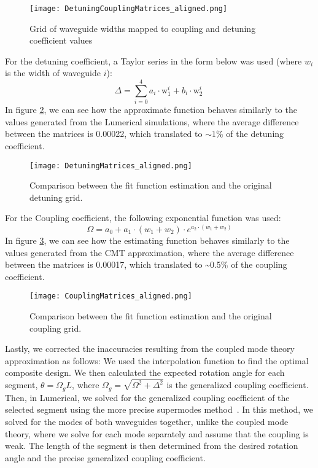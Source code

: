 \documentclass[floatfix,reprint, amsmath,amssymb,aps,superscriptaddress,nofootinbib]{revtex4-2}
\begin{document}
\begin{figure}[!h]
    \centering
    \texttt{[image: DetuningCouplingMatrices\_aligned.png]}
    \caption{Grid of waveguide widths mapped to coupling and detuning coefficient values}
    \label{fig: coupling and detuning coefficient mapping}
\end{figure}

For the detuning coefficient, a Taylor series in the form below was used (where $w_{i}$ is the width of waveguide $i$):
$$ \Delta = \sum_{i = 0}^{4} a_{i} \cdot  \text{w}_{1}^{i} + b_{i} \cdot  \text{w}_{2}^{i}\
$$
In figure \ref{fig: detuning coefficient estimating}, we can see how the approximate function behaves similarly to the values generated from the Lumerical simulations, where the average difference between the matrices is 0.00022, which translated to
$\sim 1$\% of the detuning coefficient.

\begin{figure}[!h]
    \centering
    \texttt{[image: DetuningMatrices\_aligned.png]}
    \caption{Comparison between the fit function estimation and the original detuning grid.}
    \label{fig: detuning coefficient estimating}
\end{figure}
For the Coupling coefficient, the following exponential function was used:
$$\Omega = a_{0} + 
a_{1} \cdot ( w_{1} + w_{2} ) \cdot  e^{a_{2} \cdot ( w_{1} + w_{2} )}
$$
In figure \ref{fig: coupling coefficient estimating}, we can see how the estimating function behaves similarly to the values generated from the CMT approximation, where the average difference between the matrices is 0.00017, which translated to \textasciitilde0.5\% of the coupling coefficient.

\begin{figure}[tb]
    \centering
    \texttt{[image: CouplingMatrices\_aligned.png]}
    \caption{Comparison between the fit function estimation and the original coupling grid.}
    \label{fig: coupling coefficient estimating}
\end{figure}

Lastly, we corrected the inaccuracies resulting from the coupled mode theory approximation as follows: We used the interpolation function to find the optimal composite design. We then calculated the expected rotation angle for each segment, $\theta = \Omega_g L$, where $\Omega_g = \sqrt{\Omega^2 + \Delta^2}$ is the generalized coupling coefficient. Then, in Lumerical, we solved for the generalized coupling coefficient of the selected segment using the more precise supermodes method~\cite{QuantumElectronicsYariv1989}. In this method, we solved for the modes of both waveguides together, unlike the coupled mode theory, where we solve for each mode separately and assume that the coupling is weak. The length of the segment is then determined from the desired rotation angle and the precise generalized coupling coefficient.
\end{document}
